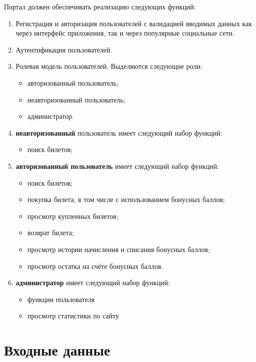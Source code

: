Портал должен обеспечивать реализацию следующих функций:
\begin{enumerate}
	\item Регистрация и авторизация пользователей с валидацией вводимых данных как через интерфейс приложения, так и через популярные социальные сети.
	\item Аутентификация пользователей.
	\item Ролевая модель пользователей. Выделяются следующие роли:
	\begin{itemize}
		\item авторизованный пользователь;
        \item неавторизованный пользователь;
		\item администратор.
	\end{itemize}
    \item \textbf{неавторизованный} пользователь имеет следующий набор функций:
    \begin{itemize}
        \item поиск билетов;
    \end{itemize}
	\item \textbf{авторизованный пользователь} имеет следующий набор функций:
	\begin{itemize}
		\item поиск билетов;
        \item покупка билета, в том числе с использованием бонусных баллов;
        \item просмотр купленных билетов;
		\item возврат билета;
        \item просмотр истории начисления и списания бонусных баллов;
        \item просмотр остатка на счёте бонусных баллов.
	\end{itemize}
	\item \textbf{администратор} имеет следующий набор функций:
    \begin{itemize}
        \item функции пользователя
        \item просмотр статистики по сайту
    \end{itemize}

\end{enumerate}

\clearpage
\section*{Входные данные}

